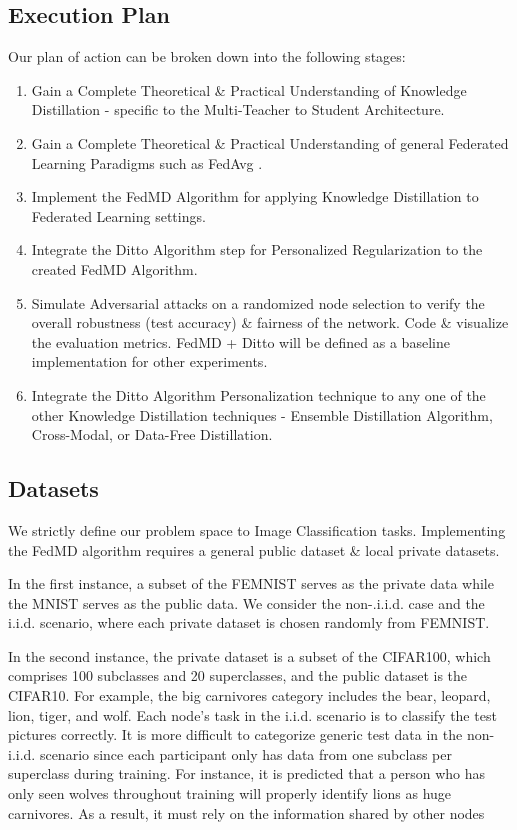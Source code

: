 \documentclass[conference]{IEEEtran}
\begin{document}
\subsection{Execution Plan}
Our plan of action can be broken down into the following stages:
\begin{enumerate}
\item Gain a Complete Theoretical \& Practical Understanding of Knowledge Distillation - specific to the Multi-Teacher to Student Architecture.
\item Gain a Complete Theoretical \& Practical Understanding of general Federated Learning Paradigms such as FedAvg \cite{b7}.
\item Implement the FedMD Algorithm for applying Knowledge Distillation to Federated Learning settings.
\item Integrate the Ditto Algorithm step for Personalized Regularization to the created FedMD Algorithm.
\item Simulate Adversarial attacks on a randomized node selection to verify the overall robustness (test accuracy) \& fairness of the network. Code \& visualize the evaluation metrics. FedMD + Ditto will be defined as a baseline implementation for other experiments.
\item Integrate the Ditto Algorithm Personalization technique to any one of the other Knowledge Distillation techniques - Ensemble Distillation Algorithm, Cross-Modal, or Data-Free Distillation.
\end{enumerate}

\subsection{Datasets}
We strictly define our problem space to Image Classification tasks. Implementing the FedMD algorithm requires a general public dataset \& local private datasets. 

In the first instance, a subset of the FEMNIST serves as the private data while the MNIST serves as the public data. We consider the non-.i.i.d. case and the i.i.d. scenario, where each private dataset is chosen randomly from FEMNIST. 

In the second instance, the private dataset is a subset of the CIFAR100, which comprises 100 subclasses and 20 superclasses, and the public dataset is the CIFAR10. For example, the big carnivores category includes the bear, leopard, lion, tiger, and wolf. Each node's task in the i.i.d. scenario is to classify the test pictures correctly. It is more difficult to categorize generic test data in the non-i.i.d. scenario since each participant only has data from one subclass per superclass during training. For instance, it is predicted that a person who has only seen wolves throughout training will properly identify lions as huge carnivores. As a result, it must rely on the information shared by other nodes
\end{document}
